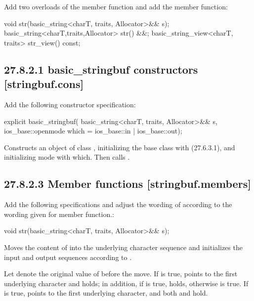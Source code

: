 \documentclass[ebook,11pt,article]{memoir}
\begin{document}
Add two overloads of the  member function and add the  member function:
\begin{codeblock}
void str(basic_string<charT, traits, Allocator>&& s);
basic_string<charT,traits,Allocator> str() &&;
basic_string_view<charT, traits> str_view() const;
\end{codeblock}

\subsection{27.8.2.1 basic\_stringbuf constructors [stringbuf.cons]}
Add the following constructor specification:
\begin{itemdecl}
      explicit basic_stringbuf(
        basic_string<charT, traits, Allocator>&& s,
        ios_base::openmode which = ios_base::in | ios_base::out);
\end{itemdecl}
\begin{itemdescr}
\pnum
\effects Constructs an object of class , initializing the base class with  (27.6.3.1), and initializing mode with which. Then calls .
\end{itemdescr}

\subsection{27.8.2.3 Member functions [stringbuf.members]}
Add the following specifications and adjust the wording of  according to the wording given for  member function.:
\begin{itemdecl}
void str(basic_string<charT, traits, Allocator>&& s);
\end{itemdecl}
\begin{itemdescr}
\pnum
\effects 
Moves the content of  into the  underlying character sequence and initializes the input and output sequences according to .

\pnum
\postconditions
Let  denote the original value of  before the move.
If  is true,  points to the first underlying character and  holds; in addition, if  is true,  holds, otherwise  is true. If  is true,  points to the first underlying character, and both  and  hold.
\end{itemdescr}
\end{document}

